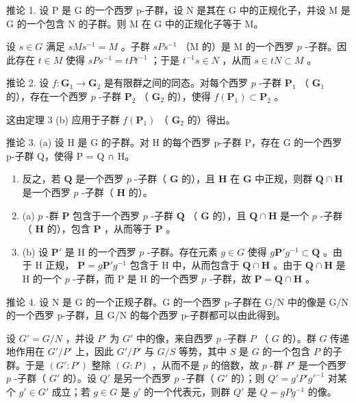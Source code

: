 推论 1. 设 P 是 G 的一个西罗 p-子群，设 N 是其在 G 中的正规化子，并设 M 是 G 的一个包含 N 的子群。则 M 在 G 中的正规化子等于 M。

设 \(s \in G\) 满足 \(sMs^{-1} = M\) 。子群 \(sPs^{-1}\) （M 的）是 M 的一个西罗 \(p\) -子群。因此存在 \(t \in M\) 使得 \(sPs^{-1} = tPt^{-1}\) ；于是 \(t^{-1}s \in N\) ，从而 \(s \in tN \subset M\) 。

推论 2. 设 \(f: \mathbf{G}_{1} \to \mathbf{G}_{2}\) 是有限群之间的同态。对每个西罗 \(p\) -子群 \(\mathbf{P}_{1}\) （ \(\mathbf{G}_{1}\) 的），存在一个西罗 \(p\) -子群 \(\mathbf{P}_{2}\) （ \(\mathbf{G}_{2}\) 的），使得 \(f(\mathbf{P}_{1}) \subset \mathbf{P}_{2}\) 。

这由定理 3 (b) 应用于子群 \(f(\mathbf{P}_1)\) （ \(\mathbf{G}_2\) 的）得出。

推论 3. (a) 设 H 是 G 的子群。对 H 的每个西罗 p-子群 P，存在 G 的一个西罗 p-子群 Q，使得 P = Q ∩ H。

\begin{enumerate}
\def\labelenumi{(\alph{enumi})}
\setcounter{enumi}{1}
\item
  反之，若 \(\mathbf{Q}\) 是一个西罗 \(p\) -子群（ \(\mathbf{G}\) 的），且 \(\mathbf{H}\) 在 \(\mathbf{G}\) 中正规，则群 \(\mathbf{Q} \cap \mathbf{H}\) 是一个西罗 \(p\) -子群（ \(\mathbf{H}\) 的）。
\item
  (a) \(p\) -群 \(\mathbf{P}\) 包含于一个西罗 \(p\) -子群 \(\mathbf{Q}\) （ \(\mathbf{G}\) 的），且 \(\mathbf{Q} \cap \mathbf{H}\) 是一个 \(p\) -子群（ \(\mathbf{H}\) 的），包含 \(\mathbf{P}\) ，从而等于 \(\mathbf{P}\) 。
\item
  (b) 设 \(\mathbf{P}'\) 是 H 的一个西罗 \(p\) -子群。存在元素 \(g \in G\) 使得 \(g\mathbf{P}'g^{-1} \subset \mathbf{Q}\) 。由于 H 正规， \(\mathbf{P} = g\mathbf{P}'g^{-1}\) 包含于 H 中，从而包含于 \(\mathbf{Q} \cap \mathbf{H}\) 。由于 \(\mathbf{Q} \cap \mathbf{H}\) 是 H 的一个 \(p\) -子群，而 P 是 H 的一个西罗 \(p\) -子群，故 \(\mathbf{P} = \mathbf{Q} \cap \mathbf{H}\) 。
\end{enumerate}

推论 4. 设 N 是 G 的一个正规子群。G 的一个西罗 p-子群在 G/N 中的像是 G/N 的一个西罗 p-子群，且 G/N 的每个西罗 p-子群都可以由此得到。

设 \(G' = G/N\) ，并设 \(P'\) 为 \(G'\) 中的像，来自西罗 \(p\) -子群 \(P\) （ \(G\) 的）。群 \(G\) 传递地作用在 \(G'/P'\) 上，因此 \(G'/P'\) 与 \(G/S\) 等势，其中 \(S\) 是 \(G\) 的一个包含 \(P\) 的子群。于是 \((G':P')\) 整除 \((G:P)\) ，从而不是 \(p\) 的倍数，故 \(p\) -群 \(P'\) 是一个西罗 \(p\) -子群（ \(G'\) 的）。设 \(Q'\) 是另一个西罗 \(p\) -子群（ \(G'\) 的）；则 \(Q' = g'P'g'^{-1}\) 对某个 \(g' \in G'\) 成立；若 \(g \in G\) 是 \(g'\) 的一个代表元，则群 \(Q'\) 是 \(Q = gPg^{-1}\) 的像。

